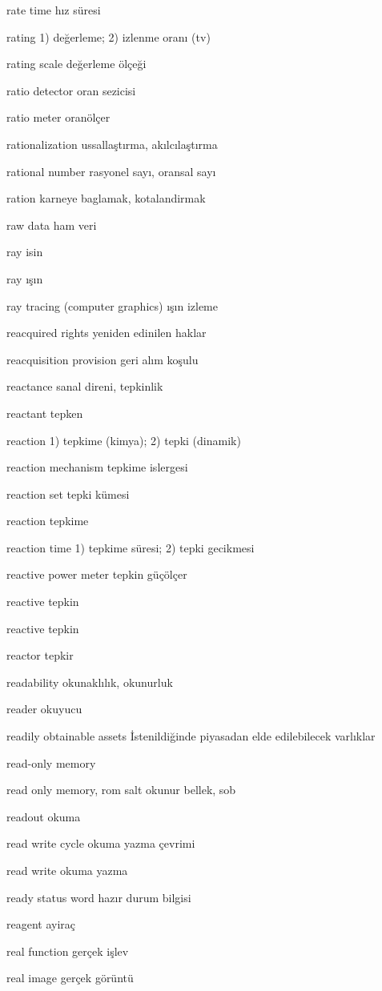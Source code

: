 \documentclass[12pt,fleqn]{article}\usepackage{../../common}
\begin{document}
rate time hız süresi

rating 1) değerleme; 2) izlenme oranı (tv)

rating scale değerleme ölçeği

ratio detector oran sezicisi

ratio meter oranölçer

rationalization ussallaştırma, akılcılaştırma\

rational number rasyonel sayı, oransal sayı

ration karneye baglamak, kotalandirmak

raw data ham veri

ray isin

ray ışın

ray tracing (computer graphics) ışın izleme

reacquired rights yeniden edinilen haklar

reacquisition provision geri alım koşulu

reactance sanal direni, tepkinlik

reactant tepken

reaction 1) tepkime (kimya); 2) tepki (dinamik)

reaction mechanism tepkime islergesi

reaction set tepki kümesi

reaction tepkime

reaction time 1) tepkime süresi; 2) tepki gecikmesi

reactive power meter tepkin güçölçer

reactive tepkin

reactive tepkin

reactor tepkir

readability okunaklılık, okunurluk

reader okuyucu

readily obtainable assets İstenildiğinde piyasadan elde edilebilecek varlıklar

read-only memory

read only memory, rom salt okunur bellek, sob

readout okuma

read write cycle okuma yazma çevrimi

read write okuma yazma

ready status word hazır durum bilgisi

reagent ayiraç

real function gerçek işlev

real image gerçek görüntü
\end{document}

